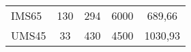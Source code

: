 \begin{table}[ht]
\begin{tabular}[t]{lcccc}
        \\
    IMS65
        &130 \cite{Kjell2011}
        &294 \cite{Kjell2011}
        &6000 \cite{Kjell2011}
        &689,66\cite{Kjell2011}
        \\
    UMS45
        &33 \cite{Kjell2011}
        &430 \cite{Kjell2011}
        &4500 \cite{Kjell2011}
        &1030,93 \cite{Kjell2011}
        \\
    \bottomrule
    \end{tabular}
\end{table}%